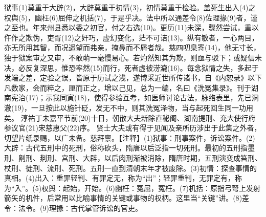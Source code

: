 \documentclass[12pt,UTF8]{ctexbook}
\begin{document}
狱事(1)莫重于大辟(2)，大辟莫重于初情(3)，初情莫重于检验。盖死生出入(4)之权舆(5)，幽枉(6)屈伸之机括(7)，于是乎决。法中所以通差令(8)佐理掾(9)者，谨之至也。年来州县悉以委之初官，付之右选(10)。更历(11)未深，骤然尝试，重以仵作之欺伪，吏胥(12)之奸巧，虚幻变化，茫不可诘(13)。纵有敏者，一心两目，亦无所用其智，而况遥望而弗亲，掩鼻而不屑者哉。慈四叨臬寄(14)，他无寸长，独于狱案审之又审，不敢萌一毫慢易心。若灼然知其为欺，则亟与驳下；或疑信未决，必反复深思，惟恐率然(15)而行，死者虚被涝漉(16)。每念狱情之失，多起于发端之差，定验之误，皆原于历试之浅，遂博采近世所传诸书，自《内恕录》以下凡数家，会而粹之，厘而正之，增以己见，总为一编，名曰《洗冤集录》。刊于湖南宪治(17)；示我同寅(18)，使得参验互考，如医师讨论古法，脉络表里，先已洞澈(19)，一旦按此以施针砭，发无不中，则其洗冤泽物，当与起死回生同一功用矣。
淳祐丁未嘉平节前(20)十日，朝散大夫新除直秘阁、湖南提刑、充大使行府参议官(21)宋慈惠父(22)序。
贤士大夫或有得于见闻及亲所历涉出于此集之外者，切望片纸录赐，以广未备。慈拜禀。【注释】(1)狱事：刑事案件，诉讼案件。(2)大辟：古代五刑中的死刑，俗称砍头，隋唐以后泛指一切死刑。最初的五刑指墨刑、劓刑、剕刑、宫刑、大辟，以后肉刑渐被消除，隋唐时期，五刑演变成笞刑、杖刑、徒刑、流刑、死刑。五刑一直到清朝末年才被废除。(3)初情：探查事情的真相。(4)出入：重罪轻判、有罪定无，称为“出”；轻罪重判，无罪定有，称为“入”。(5)权舆：起始，开始。(6)幽枉：冤屈，冤枉。(7)机括：原指弓弩上发射箭矢的机件，后常用以比喻事情的关键或事物的权柄。这里当“关键”讲。(8)差令：法令。(9)理掾：古代掌管诉讼的官吏。
\end{document}
